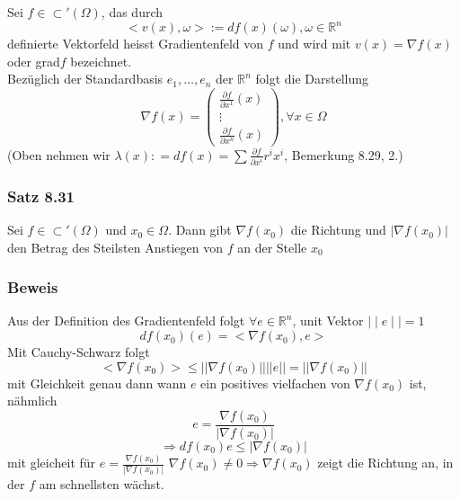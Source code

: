 \begin{definition}{8.30}
Sei $f\in\subset'\left(\Omega\right)$, das durch $$< v(x),\omega >:=df(x)(\omega ), \omega\in\mathbb{R}^n$$ definierte Vektorfeld heisst Gradientenfeld von $f$ und wird mit $v(x)=\nabla f(x)$ oder grad$f$ bezeichnet. \\

Bezüglich der Standardbasis $e_1,\dots, e_n$ der $\mathbb{R}^n$ folgt die Darstellung 
\[\nabla f(x) = \left( {\begin{array}{*{20}{c}}
{\frac{{\partial f}}{{\partial {x^1}}}(x)}\\
 \vdots \\
{\frac{{\partial f}}{{\partial {x^n}}}(x)}
\end{array}} \right),\forall x \in \Omega \]
(Oben nehmen wir $\lambda (x): = df(x) = \sum {\frac{{\partial f}}{{\partial {x^i}}}{r^i}{x^i}} $, Bemerkung 8.29, 2.)
\end{definition}
\subsubsection*{Satz 8.31}
Sei $f\in\subset '\left(\Omega\right)$ und $x_0\in\Omega$. Dann gibt $\nabla f\left(x_0\right)$ die Richtung und $\left| \nabla f\left(x_0\right)\right|$ den Betrag des Steilsten Anstiegen von $f$ an der Stelle $x_0$
\subsubsection*{Beweis}
Aus der Definition des Gradientenfeld folgt $\forall e\in\mathbb{R}^n$, unit Vektor $\mid\mid e\mid\mid =1$ $$df\left(x_0\right)\left( e\right)=< \nabla f\left( x_0\right) ,e >$$
Mit Cauchy-Schwarz folgt 
$$<\nabla f\left( x_0\right)>\leq\left|\left|\nabla f\left( x_0\right)\right|\right|\left|\left| e\right|\right| = \left|\left| \nabla f\left( x_0\right)\right|\right|$$
mit Gleichkeit genau dann wann $e$ ein positives vielfachen von $\nabla f\left( x_0\right)$ ist, nähmlich $$e=\frac{\nabla f\left( x_0\right)}{\left| \nabla f\left( x_0\right)\right|}$$ $$\Rightarrow df\left( x_0\right) e \leq \left| \nabla f\left( x_0\right)\right|$$
mit gleicheit für $e=\frac{\nabla f\left( x_0\right)}{\left| \nabla f\left( x_0\right)\right|}$
$\nabla f\left( x_0\right)\not= 0\Rightarrow \nabla f\left( x_0\right)$ zeigt die Richtung an, in der $f$ am schnellsten wächst.\\

